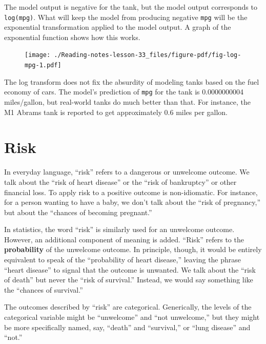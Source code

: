 \documentclass[
  letterpaper,
  DIV=11,
  numbers=noendperiod,
  oneside]{scrreprt}
\begin{document}
{\begin{footnotesize}
The model output is negative for the tank, but the model output
corresponds to \texttt{log(mpg)}. What will keep the model from
producing negative \texttt{mpg} will be the exponential transformation
applied to the model output. A graph of the exponential function shows
how this works.

\begin{figure}


{\centering \texttt{[image: ./Reading-notes-lesson-33\_files/figure-pdf/fig-log-mpg-1.pdf]}

}

\end{figure}

The log transform does not fix the absurdity of modeling tanks based on
the fuel economy of cars. The model's prediction of \texttt{mpg} for the
tank is 0.0000000004 miles/gallon, but real-world tanks do much better
than that. For instance, the M1 Abrams tank is reported to get
approximately 0.6 miles per gallon.

\hypertarget{risk}{%
\section{Risk}\label{risk}}

In everyday language, ``risk'' refers to a dangerous or unwelcome
outcome. We talk about the ``risk of heart disease'' or the ``risk of
bankruptcy'' or other financial loss. To apply risk to a positive
outcome is non-idiomatic. For instance, for a person wanting to have a
baby, we don't talk about the ``risk of pregnancy,'' but about the
``chances of becoming pregnant.''

In statistics, the word ``risk'' is similarly used for an unwelcome
outcome. However, an additional component of meaning is added. ``Risk''
refers to the \textbf{probability} of the unwelcome outcome. In
principle, though, it would be entirely equivalent to speak of the
``probability of heart disease,'' leaving the phrase ``heart disease''
to signal that the outcome is unwanted. We talk about the ``risk of
death'' but never the ``risk of survival.'' Instead, we would say
something like the ``chances of survival.''

The outcomes described by ``risk'' are categorical. Generically, the
levels of the categorical variable might be ``unwelcome'' and ``not
unwelcome,'' but they might be more specifically named, say, ``death''
and ``survival,'' or ``lung disease'' and ``not.''


\end{footnotesize}}
\end{document}

